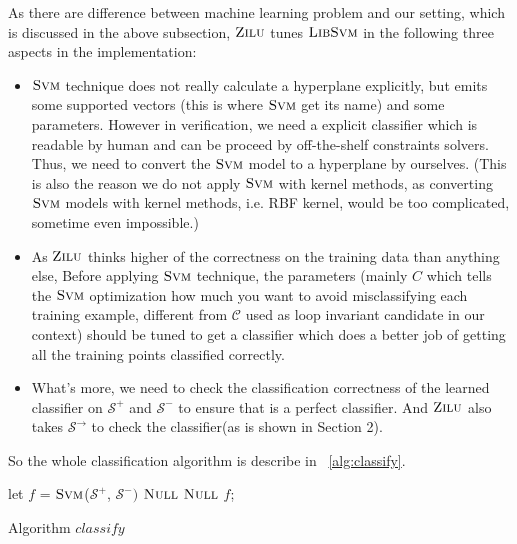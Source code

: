 As there are difference between machine learning problem and our setting, which is discussed in the above subsection,
$\textsc{Zilu}$ tunes $\textsc{LibSvm}$ in the following three aspects in the implementation: 
\begin{itemize}
\item $\textsc{Svm}$ technique does not really calculate a hyperplane explicitly, 
but emits some supported vectors (this is where $\textsc{Svm}$ get its name) and some parameters.
However in verification, we need a explicit classifier which is readable by human and can be proceed by off-the-shelf constraints solvers.
Thus, we need to convert the $\textsc{Svm}$ model to a hyperplane by ourselves.
(This is also the reason we do not apply $\textsc{Svm}$ with kernel methods,
as converting $\textsc{Svm}$ models with kernel methods, i.e. RBF kernel, would be too complicated, sometime even impossible.)
\item As $\textsc{Zilu}$ thinks higher of the correctness on the training data than anything else,
Before applying $\textsc{Svm}$ technique, the parameters (mainly $C$ which tells the $\textsc{Svm}$ optimization how much you want to avoid misclassifying each training example,
different from $\mathcal{C}$ used as loop invariant candidate in our context) 
should be tuned to get a classifier which does a better job of getting all the training points classified correctly.
\item What's more, we need to check the classification correctness of the learned classifier 
on $\mathcal{S}^+$ and $\mathcal{S}^-$ to ensure that is a perfect classifier.
And $\textsc{Zilu}$ also takes $\mathcal{S}^\rightarrow$ to check the classifier(as is shown in Section 2).
\end{itemize} 

So the whole classification algorithm is describe in ~\ref{alg:classify}.

\begin{algorithm}[t]
\SetAlgoVlined
\Indm
{}
\Indp
    let $f$ = $\textsc{Svm}$($\mathcal{S}^+$, $\mathcal{S}^-)$\;
     {
    	\Return $\textsc{Null}$\;
    }
	 {
	    \Return $\textsc{Null}$\;
    }
    \Return $f$;
\caption{Algorithm $classify$}
\label{alg:classify}
\end{algorithm}

